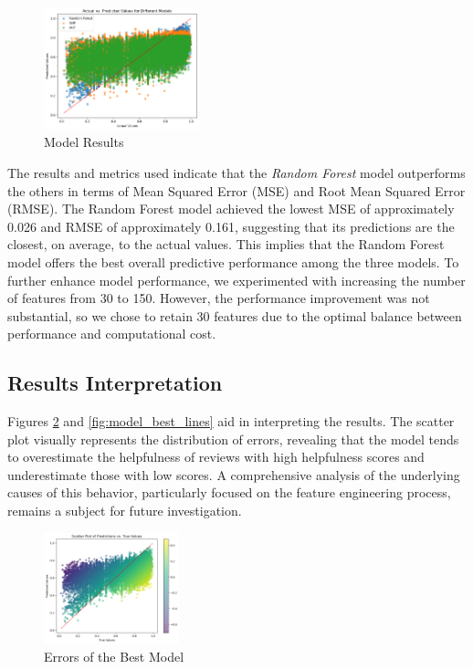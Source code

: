 \begin{figure}[H]
    \centering
    \includegraphics[width=0.4\textwidth]{./figures/model_results.png}
    \caption{Model Results}
    \label{fig:model_results}
\end{figure}

\noindent
The results and metrics used indicate that the \textit{Random Forest} model outperforms the others in terms of Mean Squared Error (MSE)
and Root Mean Squared Error (RMSE). The Random Forest model achieved the lowest MSE of approximately 0.026 and RMSE of approximately 0.161,
suggesting that its predictions are the closest, on average, to the actual values. This implies that the Random Forest model offers the
best overall predictive performance among the three models. To further enhance model performance, we experimented with increasing the
number of features from 30 to 150. However, the performance improvement was not substantial, so we chose to retain 30 features due to the
optimal balance between performance and computational cost.

\subsection*{Results Interpretation}
Figures \ref{fig:model_best_scatter} and \ref{fig:model_best_lines} aid in interpreting the results. The scatter plot visually represents
the distribution of errors, revealing that the model tends to overestimate the helpfulness of reviews with high helpfulness scores and
underestimate those with low scores. A comprehensive analysis of the underlying causes of this behavior, particularly focused on the 
feature engineering process, remains a subject for future investigation.

\begin{figure}[H]
    \centering
    \includegraphics[width=0.35\textwidth]{./figures/model_best_scatter.png}
    \caption{Errors of the Best Model}
    \label{fig:model_best_scatter}
\end{figure}

